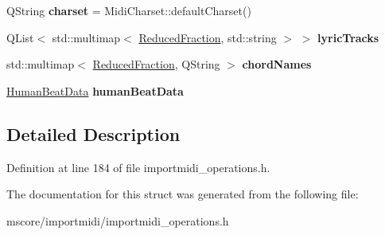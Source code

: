 \begin{DoxyCompactItemize}
\item 
\mbox{\label{struct_ms_1_1_midi_operations_1_1_file_data_a465074e8718d3946c58cfab3ff7a48c4}} 
Q\+String {\bfseries charset} = Midi\+Charset\+::default\+Charset()
\item 
\mbox{\label{struct_ms_1_1_midi_operations_1_1_file_data_a0e12d3d14f3d4c4b037da9f255403b84}} 
Q\+List$<$ std\+::multimap$<$ \hyperlink{class_ms_1_1_reduced_fraction}{Reduced\+Fraction}, std\+::string $>$ $>$ {\bfseries lyric\+Tracks}
\item 
\mbox{\label{struct_ms_1_1_midi_operations_1_1_file_data_a85f1025e45beefdb887b517b7f92ca70}} 
std\+::multimap$<$ \hyperlink{class_ms_1_1_reduced_fraction}{Reduced\+Fraction}, Q\+String $>$ {\bfseries chord\+Names}
\item 
\mbox{\label{struct_ms_1_1_midi_operations_1_1_file_data_ad28416ebcb1a505e7c0d7ab165ca52ac}} 
\hyperlink{struct_ms_1_1_midi_operations_1_1_human_beat_data}{Human\+Beat\+Data} {\bfseries human\+Beat\+Data}
\end{DoxyCompactItemize}


\subsection{Detailed Description}


Definition at line 184 of file importmidi\+\_\+operations.\+h.



The documentation for this struct was generated from the following file\+:\begin{DoxyCompactItemize}
\item 
mscore/importmidi/importmidi\+\_\+operations.\+h\end{DoxyCompactItemize}
